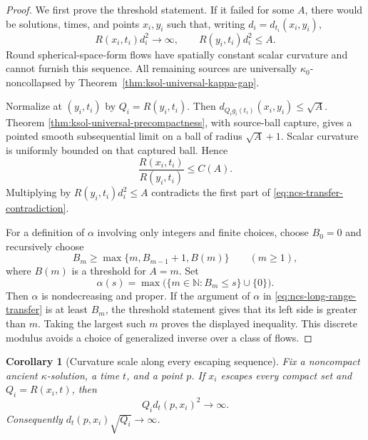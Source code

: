 \documentclass[10pt]{coll-l}
\newtheorem{corollary}[theorem]{Corollary}
\theoremstyle{definition}
\theoremstyle{remark}
\numberwithin{section}{chapter}
\numberwithin{equation}{chapter}
\begin{document}
\begin{proof}
We first prove the threshold statement.  If it failed for some $A$, there
would be solutions, times, and points $x_i,y_i$ such that, writing
$d_i=d_{t_i}(x_i,y_i)$,
\begin{equation}
 R(x_i,t_i)d_i^2\longrightarrow\infty,\qquad
 R(y_i,t_i)d_i^2\leq A.                                \label{eq:ncs-transfer-contradiction}
\end{equation}
Round spherical-space-form flows have spatially constant scalar curvature
and cannot furnish this sequence.  All remaining sources are universally
$\kappa_0$-noncollapsed by
Theorem~\ref{thm:ksol-universal-kappa-gap}.

Normalize at $(y_i,t_i)$ by $Q_i=R(y_i,t_i)$.  Then
$d_{Q_ig_i(t_i)}(x_i,y_i)\leq\sqrt A$.  Theorem
\ref{thm:ksol-universal-precompactness}, with source-ball capture, gives a
pointed smooth subsequential limit on a ball of radius $\sqrt A+1$.
Scalar curvature is uniformly bounded on that captured ball.  Hence
\begin{equation}
 \frac{R(x_i,t_i)}{R(y_i,t_i)}\leq C(A).                \label{eq:ncs-transfer-local-ratio}
\end{equation}
Multiplying by $R(y_i,t_i)d_i^2\leq A$ contradicts the first part of
\eqref{eq:ncs-transfer-contradiction}.

For a definition of $\alpha$ involving only integers and finite choices,
choose $B_0=0$ and recursively choose
\begin{equation}
 B_m\geq\max\{m,B_{m-1}+1,B(m)\}\qquad(m\geq1),        \label{eq:ncs-Bm-choice}
\end{equation}
where $B(m)$ is a threshold for $A=m$.  Set
\begin{equation}
 \alpha(s)=\max\bigl(\{m\in\mathbb N:B_m\leq s\}\cup\{0\}\bigr).
                                                               \label{eq:ncs-alpha-discrete}
\end{equation}
Then $\alpha$ is nondecreasing and proper.  If the argument of $\alpha$ in
\eqref{eq:ncs-long-range-transfer} is at least $B_m$, the threshold
statement gives that its left side is greater than $m$.  Taking the largest
such $m$ proves the displayed inequality.  This discrete modulus avoids a
choice of generalized inverse over a class of flows.
\end{proof}

\begin{corollary}[Curvature scale along every escaping sequence]
\label{cor:ncs-escape-curvature-scale}
Fix a noncompact ancient $\kappa$-solution, a time $t$, and a point $p$.
If $x_i$ escapes every compact set and $Q_i=R(x_i,t)$, then
\begin{equation}
             Q_i d_t(p,x_i)^2\longrightarrow\infty.    \label{eq:ncs-escape-QD}
\end{equation}
Consequently $d_t(p,x_i)\sqrt{Q_i}\to\infty$.
\end{corollary}
\end{document}
